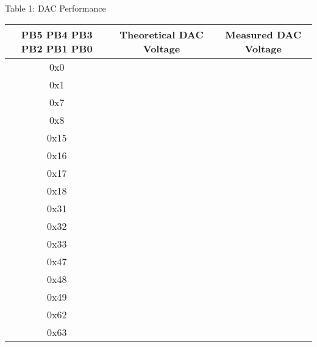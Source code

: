 \documentclass[11pt]{article}
\begin{document}
\noindent Table 1: DAC Performance
\begin{center}
\begin{tabular}{c | c | c}
    \hline
    PB5 PB4 PB3 PB2 PB1 PB0 & Theoretical DAC Voltage & Measured DAC Voltage \\
    \hline
    0x0 & & \\
    0x1 & & \\
    0x7 & & \\
    0x8 & & \\
    0x15 & & \\
    0x16 & & \\
    0x17 & & \\
    0x18 & & \\
    0x31 & & \\
    0x32 & & \\
    0x33 & & \\
    0x47 & & \\
    0x48 & & \\
    0x49 & & \\
    0x62 & & \\
    0x63 & & \\
\end{tabular}
\end{center}
\end{document}
